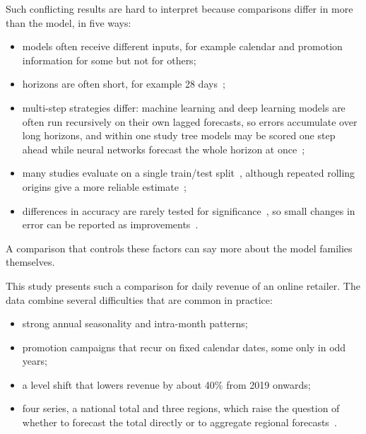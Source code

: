 \documentclass[conference]{IEEEtran}
\begin{document}
Such conflicting results are hard to interpret because comparisons differ in more than the model, in five ways:
\begin{itemize}
\item models often receive different inputs, for example calendar and promotion information for some but not for others;
\item horizons are often short, for example 28 days~\cite{hasan2022comparative};
\item multi-step strategies differ: machine learning and deep learning models are often run recursively on their own lagged forecasts, so errors accumulate over long horizons, and within one study tree models may be scored one step ahead while neural networks forecast the whole horizon at once~\cite{hobor2026comparative};
\item many studies evaluate on a single train/test split~\cite{hasan2022comparative,retail2023multivariate,hobor2026comparative}, although repeated rolling origins give a more reliable estimate~\cite{tashman2000outofsample,bergmeir2018cv};
\item differences in accuracy are rarely tested for significance~\cite{diebold1995dm,demsar2006statistical}, so small changes in error can be reported as improvements~\cite{retail2023multivariate}.
\end{itemize}
A comparison that controls these factors can say more about the model families themselves.

This study presents such a comparison for daily revenue of an online retailer.
The data combine several difficulties that are common in practice:
\begin{itemize}
\item strong annual seasonality and intra-month patterns;
\item promotion campaigns that recur on fixed calendar dates, some only in odd years;
\item a level shift that lowers revenue by about 40\% from 2019 onwards;
\item four series, a national total and three regions, which raise the question of whether to forecast the total directly or to aggregate regional forecasts~\cite{hyndman2011hierarchical}.
\end{itemize}
\end{document}
